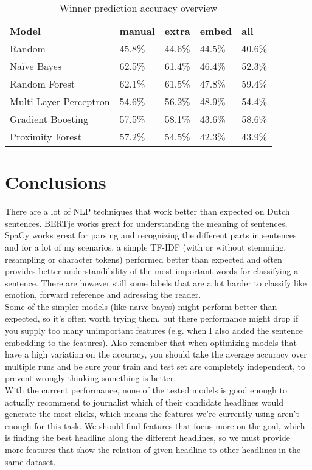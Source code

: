 \documentclass{article}
\begin{document}
\begin{table}[]
\begin{tabular}{lllll}
\textbf{Model}         & \textbf{manual} & \textbf{extra} & \textbf{embed} & \textbf{all} \\
Random                 & 45.8\%          & 44.6\%         & 44.5\%         & 40.6\%       \\
Naïve Bayes            & 62.5\%          & 61.4\%         & 46.4\%         & 52.3\%       \\
Random Forest          & 62.1\%          & 61.5\%         & 47.8\%         & 59.4\%       \\
Multi Layer Perceptron & 54.6\%          & 56.2\%         & 48.9\%         & 54.4\%       \\
Gradient Boosting      & 57.5\%          & 58.1\%         & 43.6\%         & 58.6\%       \\
Proximity Forest       & 57.2\%          & 54.5\%         & 42.3\%         & 43.9\%
\end{tabular}

\caption{Winner prediction accuracy overview}
\label{tab:overview}
\end{table}

\section{Conclusions}
There are a lot of NLP techniques that work better than expected on Dutch sentences. BERTje works great for understanding the meaning of sentences, SpaCy works great for parsing and recognizing the different parts in sentences and for a lot of my scenarios, a simple TF-IDF (with or without stemming, resampling or character tokens) performed better than expected and often provides better understandibility of the most important words for classifying a sentence. There are however still some labels that are a lot harder to classify like emotion, forward reference and adressing the reader.\\

Some of the simpler models (like naïve bayes) might perform better than expected, so it's often worth trying them, but there performance might drop if you supply too many unimportant features (e.g. when I also added the sentence embedding to the features). Also remember that when optimizing models that have a high variation on the accuracy, you should take the average accuracy over multiple runs and be sure your train and test set are completely independent, to prevent wrongly thinking something is better.\\

With the current performance, none of the tested models is good enough to actually recommend to journalist which of their candidate headlines would generate the most clicks, which means the features we're currently using aren't enough for this task. We should find features that focus more on the goal, which is finding the best headline along the different headlines, so we must provide more features that show the relation of given headline to other headlines in the same dataset.

\clearpage


\clearpage
\end{document}
